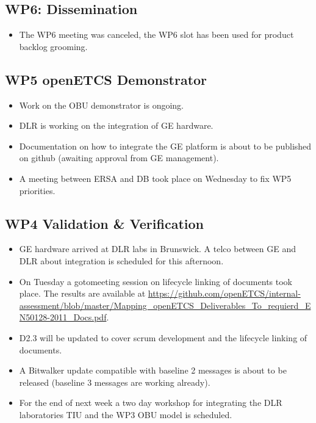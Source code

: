 \documentclass[a4paper, 11pt]{article}
\begin{document}
\subsection{WP6: Dissemination}
\begin{itemize}
\item The WP6 meeting was canceled, the WP6 slot has been used for product backlog grooming.
\end{itemize}

\subsection{WP5 openETCS Demonstrator}

\begin{itemize}
\item Work on the OBU demonstrator is ongoing.
\item DLR is working on the integration of GE hardware.
\item Documentation on how to integrate the GE platform is about to be published on github (awaiting approval from GE management).
\item A meeting between ERSA and DB took place on Wednesday to fix WP5 priorities.
\end{itemize}

\subsection{WP4 Validation \& Verification}
\begin{itemize}
\item GE hardware arrived at DLR labs in Brunswick. A telco between GE and DLR about integration is scheduled for this afternoon.
\item On Tuesday a gotomeeting session on lifecycle linking of documents took place. The results are available at \url{https://github.com/openETCS/internal-assessment/blob/master/Mapping_openETCS_Deliverables_To_requierd_EN50128-2011_Docs.pdf}.
\item D2.3 will be updated to cover scrum development and the lifecycle linking of documents. 
\item A Bitwalker update compatible with baseline 2 messages is about to be released (baseline 3 messages are working already).
\item For the end of next week a two day workshop for integrating the DLR laboratories TIU and the WP3 OBU model is scheduled.
\end{itemize}
\end{document}
